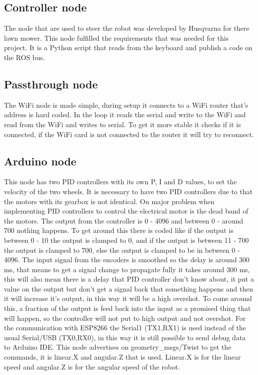 \documentclass[11pt]{article}
\begin{document}
\subsection{Controller node}
The node that are used to steer the robot was developed by Husqvarna for there lawn mower. This node fulfilled the requirements that was needed for this project. It is a Python script that reads from the keyboard and publish a code on the ROS bus.
\label{subsec:cn}


\subsection{Passthrough node}
The WiFi node is made simple, during setup it connects to a WiFi router that's address is hard coded. In the loop it reads the serial and write to the WiFi and read from the WiFi and writes to serial. To get it more stable it checks if it is connected, if the WiFi card is not connected to the router it will try to reconnect.
\label{subsec:ptn}

\subsection{Arduino node}
This node has two PID controllers with its own P, I and D values, to set the velocity of the two wheels. It is necessary to have two PID controllers due to that the motors with its gearbox is not identical.
On major problem when implementing PID controllers to control the electrical motor is the dead band of the motors. The output from the controller is 0 - 4096 and between 0 - around 700 nothing happens. To get around this there is coded like if the output is between 0 - 10 the output is clamped to 0, and if the output is between 11 - 700 the output is clamped to 700, else the output is clamped to be in between 0 - 4096.
The input signal from the encoders is smoothed so the delay is around 300 ms, that means to get a signal change to propagate fully it takes around 300 ms, this will also mean there is a delay that PID controller don't know about, it put a value on the output but don't get a signal back that something happens and then it will increase it's output, in this way it will be a high overshot. To come around this, a fraction of the output is feed back into the input as a promised thing that will happen, so the controller will not put to high output and not overshot.
For the communication with ESP8266 the Serial1 (TX1,RX1) is used instead of the usual Serial/USB (TX0,RX0), in this way it is still possible to send debug data to Arduino IDE.
This node advertises on geometry_msgs/Twist to get the commands, it is linear.X and angular.Z that is used. Linear.X is for the linear speed and angular.Z is for the angular speed of the robot. 
\label{subsec:dd}
\end{document}
